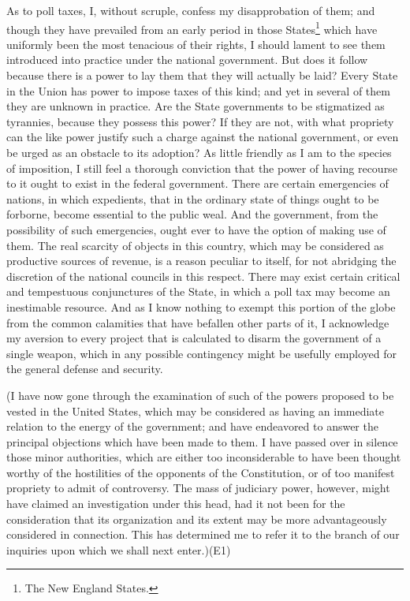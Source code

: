 As to poll taxes, I, without scruple, confess my disapprobation of them; and though they have prevailed from an early period in those States\footnote{The New England States.} which have uniformly been the most tenacious of their rights, I should lament to see them introduced into practice under the national government. 
But does it follow because there is a power to lay them that they will actually be laid? 
Every State in the Union has power to impose taxes of this kind; and yet in several of them they are unknown in practice. 
Are the State governments to be stigmatized as tyrannies, because they possess this power? 
If they are not, with what propriety can the like power justify such a charge against the national government, or even be urged as an obstacle to its adoption? 
As little friendly as I am to the species of imposition, I still feel a thorough conviction that the power of having recourse to it ought to exist in the federal government. 
There are certain emergencies of nations, in which expedients, that in the ordinary state of things ought to be forborne, become essential to the public weal. 
And the government, from the possibility of such emergencies, ought ever to have the option of making use of them. 
The real scarcity of objects in this country, which may be considered as productive sources of revenue, is a reason peculiar to itself, for not abridging the discretion of the national councils in this respect. 
There may exist certain critical and tempestuous conjunctures of the State, in which a poll tax may become an inestimable resource. 
And as I know nothing to exempt this portion of the globe from the common calamities that have befallen other parts of it, I acknowledge my aversion to every project that is calculated to disarm the government of a single weapon, which in any possible contingency might be usefully employed for the general defense and security.

(I have now gone through the examination of such of the powers proposed to be vested in the United States, which may be considered as having an immediate relation to the energy of the government; and have endeavored to answer the principal objections which have been made to them. 
I have passed over in silence those minor authorities, which are either too inconsiderable to have been thought worthy of the hostilities of the opponents of the Constitution, or of too manifest propriety to admit of controversy. 
The mass of judiciary power, however, might have claimed an investigation under this head, had it not been for the consideration that its organization and its extent may be more advantageously considered in connection. 
This has determined me to refer it to the branch of our inquiries upon which we shall next enter.)(E1)


